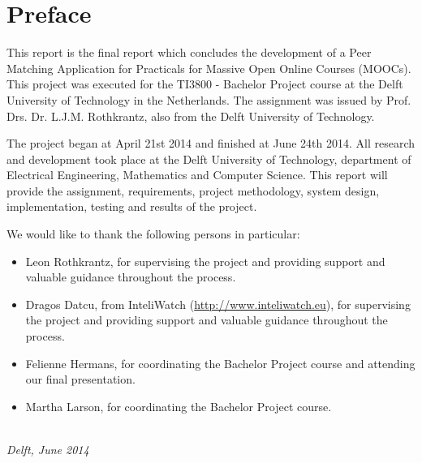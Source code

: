 \chapter*{Preface}

This report is the final report which concludes the development of a Peer Matching Application for Practicals for Massive Open Online Courses (MOOCs).
This project was executed for the TI3800 - Bachelor Project course at the Delft University of Technology in the Netherlands.
The assignment was issued by Prof. Drs. Dr. L.J.M. Rothkrantz, also from the Delft University of Technology.

The project began at April 21st 2014 and finished at June 24th 2014. All research and development took place at the Delft University of Technology, department of Electrical Engineering, Mathematics and Computer Science. This report will provide the assignment, requirements, project methodology, system design, implementation, testing and results of the project.

We would like to thank the following persons in particular:
\begin{itemize}
\item Leon Rothkrantz, for supervising the project and providing support and valuable guidance throughout the process.
\item Dragos Datcu, from InteliWatch (\url{http://www.inteliwatch.eu}), for supervising the project and providing support and valuable guidance throughout the process.
\item Felienne Hermans, for coordinating the Bachelor Project course and attending our final presentation.
\item Martha Larson, for coordinating the Bachelor Project course.
\end{itemize}

\begin{flushright}
{\makeatletter\itshape
    \@author \\
    Delft, June 2014
\makeatother}
\end{flushright}

